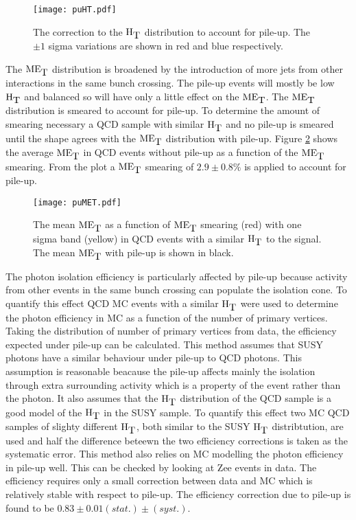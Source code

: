 \begin{figure}
\begin{center}
\texttt{[image: puHT.pdf]}
\end{center}
\caption{The correction to the $\mbox{H}_{\mbox{T}}$ distribution to account for pile-up. The
$\pm 1$ sigma variations are shown in red and blue respectively.}
\label{fig:puHT}
\end{figure}

The $\mbox{ME}_{\mbox{T}}$ distribution is broadened by the introduction of more jets from other
interactions in the same bunch crossing. The pile-up events will mostly be low
$\mbox{H}_{\mbox{T}}$ and balanced so will have only a little effect on the $\mbox{ME}_{\mbox{T}}$. The $\mbox{ME}_{\mbox{T}}$
distribution is smeared to account for pile-up. To determine the amount of
smearing necessary a QCD sample with similar $\mbox{H}_{\mbox{T}}$ and no pile-up is smeared
until the shape agrees with the $\mbox{ME}_{\mbox{T}}$ distribution with pile-up. Figure 
\ref{fig:puMET} shows the average $\mbox{ME}_{\mbox{T}}$ in QCD events without pile-up as a 
function of the $\mbox{ME}_{\mbox{T}}$ smearing. From the plot a $\mbox{ME}_{\mbox{T}}$ smearing of 
$2.9\pm0.8\%$ is applied to account for pile-up. \\

\begin{figure}
\begin{center}
\texttt{[image: puMET.pdf]}
\end{center}
\caption{The mean $\mbox{ME}_{\mbox{T}}$ as a function of $\mbox{ME}_{\mbox{T}}$ smearing (red) with one sigma
band (yellow) in QCD events with a similar $\mbox{H}_{\mbox{T}}$ to the signal. The mean $\mbox{ME}_{\mbox{T}}$ 
with pile-up is shown in black.}
\label{fig:puMET}
\end{figure}

The photon isolation efficiency is particularly affected by pile-up because
activity from other events in the same bunch crossing can populate the isolation
cone. To quantify this effect QCD MC events with a similar $\mbox{H}_{\mbox{T}}$ were used to
determine the photon efficiency in MC as a function of the number of primary
vertices. Taking the distribution of number of primary vertices from data, the
efficiency expected under pile-up can be calculated. This method assumes that
SUSY photons have a similar behaviour under pile-up to QCD photons. This
assumption is reasonable beacause the pile-up affects mainly the isolation
through extra surrounding activity which is a property of the event rather than
the photon. It also assumes that the $\mbox{H}_{\mbox{T}}$ distribution of the QCD sample is a
good model of the $\mbox{H}_{\mbox{T}}$ in the SUSY sample. To quantify this effect two MC QCD
samples of slighty different $\mbox{H}_{\mbox{T}}$, both similar to the SUSY $\mbox{H}_{\mbox{T}}$
distribtution, are used and half the difference beteewn the two efficiency
corrections is taken as the systematic error. This method also relies on MC
modelling the photon efficiency in pile-up well. This can be checked by looking
at Zee events in data. The efficiency requires only a small correction between
data and MC which is relatively stable with respect to pile-up. The efficiency
correction due to pile-up is found to be $0.83\pm0.01(stat.)\pm(syst.)$. \\


